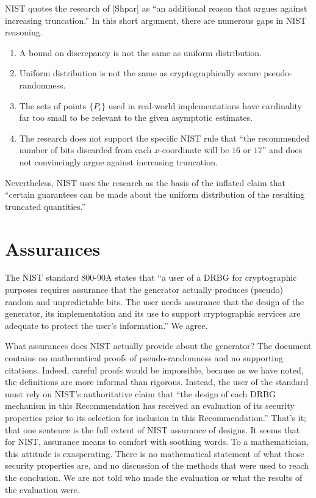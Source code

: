 \documentclass[11pt]{amsart} %
\begin{document}
NIST quotes the research of [Shpar] as ``an additional reason that argues against increasing truncation.''
In this short argument, there are numerous gaps in NIST reasoning.
\begin{enumerate}
\item A bound on discrepancy is not the same as uniform distribution.
\item Uniform distribution is not the same as cryptographically secure pseudo-randomness.
\item The sets of points $\{P_i\}$ used in real-world implementations have cardinality far too small to
be relevant to the given asymptotic estimates.
\item The research does not support the specific NIST rule that ``the recommended number of bits discarded
from each $x$-coordinate will be $16$ or $17$'' and does not convincingly argue against increasing truncation.
\end{enumerate}
Nevertheless, NIST uses the research as the basis of the inflated claim that ``certain
guarantees can be made about the uniform distribution of the resulting truncated quantities.''

\section{Assurances}

The NIST standard 800-90A states that ``a user of a DRBG for cryptographic purposes requires assurance
that the generator actually produces (pseudo) random and unpredictable bits.  The user needs assurance
that the design of the generator, its implementation and its use to support cryptographic services are
adequate to protect the user's information.'' We agree.

What assurances does NIST actually provide about the generator?  
The document contains no mathematical proofs of pseudo-randomness and no supporting citations.  
Indeed, careful proofs would be impossible,
because as we have noted,
the definitions are more informal than rigorous.  Instead, the user of the standard must
rely on NIST's authoritative claim that ``the design of each DRBG mechanism in this Recommendation has
received an evaluation of its security properties prior to its selection for inclusion in this Recommendation.''
That's it;  that one sentence is the full extent of NIST assurance of designs.   It seems that for NIST,
assurance means to comfort with soothing words. To a mathematician, this attitude is exasperating.
 There is no mathematical statement of what
those security properties are, and no discussion of the methods that were used to reach the conclusion.
We are not told who made the evaluation or what the results of the evaluation were.
\end{document}
